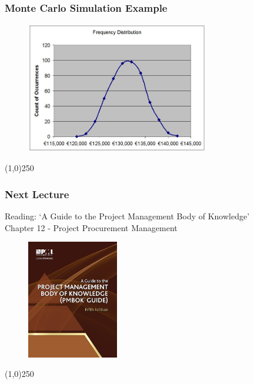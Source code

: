 \begin{frame}
\frametitle{Monte Carlo Simulation Example}
\begin{figure}[h]
	\centering
		\includegraphics[width = 8cm]{images/montesample2.jpg}
	\label{fig:montesample2}
\end{figure}

\end{frame}\begin{center}\line(1,0){250}\end{center}

\begin{frame}
\frametitle{Next Lecture}{Reading:}
`A Guide to the Project Management Body of Knowledge'\\ 
Chapter 12 - Project Procurement Management
\begin{figure}[h]
	\centering
		\includegraphics[width = 4cm]{images/book.jpg}
\end{figure}
\end{frame}\begin{center}\line(1,0){250}\end{center}



 
